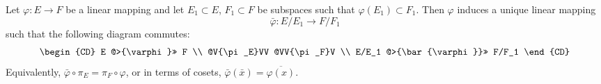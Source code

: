 Let $\varphi: E \to F$ be a linear mapping and let $E_1 \subset E$, $F_1 \subset F$ be subspaces such that $\varphi(E_1) \subset F_1$. Then $\varphi$ induces a unique linear mapping
$$
\bar{\varphi}: E/E_1 \to F/F_1
$$
such that the following diagram commutes:
$$
\begin{CD}
E @>{\varphi}>> F \\
@V{\pi_E}VV @VV{\pi_F}V \\
E/E_1 @>{\bar{\varphi}}>> F/F_1
\end{CD}
$$
Equivalently, $\bar{\varphi} \circ \pi_E = \pi_F \circ \varphi$, or in terms of cosets, $\bar{\varphi}(\bar{x}) = \overline{\varphi(x)}$.
